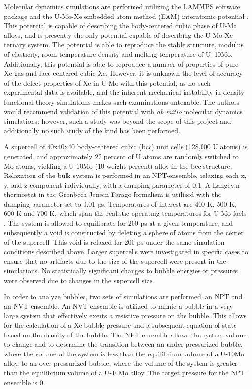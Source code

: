 \documentclass[review]{elsarticle}
\providecommand{\DIFaddtex}[1]{{\protect\color{blue} \sf #1}} %
\providecommand{\DIFaddbegin}{} %
\providecommand{\DIFaddend}{} %
\providecommand{\DIFadd}[1]{\texorpdfstring{\DIFaddtex{#1}}{#1}} %
\newcommand{\DIFaddincludegraphics}[2][]{{\color{blue}\fbox{\DIFOincludegraphics[#1]{#2}}}} %
\DeclareRobustCommand{\DIFaddbegin}{\DIFOaddbegin \let\includegraphics\DIFaddincludegraphics} %
\DeclareRobustCommand{\DIFaddend}{\DIFOaddend \let\includegraphics\DIFOincludegraphics} %
\begin{document}
Molecular dynamics simulations are performed utilizing the LAMMPS \cite{plimpton1995} software package and the U-Mo-Xe embedded atom method (EAM) interatomic potential \cite{smirnovaUMo}. \DIFaddbegin \DIFadd{This potential is capable of describing the body-centered cubic phase of U-Mo alloys, and is presently the only potential capable of describing the U-Mo-Xe ternary system. The potential is able to reproduce the stable structure, modulus of elasticity, room-temperature density and melting temperature of U–10Mo. Additionally, this potential is able to reproduce a number of properties of pure Xe gas and face-centered cubic Xe. However, it is unknown the level of accuracy of the defect properties of Xe in U-Mo with this potential, as no such experimental data is available, and the inherent mechanical instability in density functional theory simulations makes such examinations untenable. The authors would recommend validation of this potential with \textit{ab initio} molecular dynamics simulations; however, such a study was beyond the scope of this project and additionally no such study of the kind has been performed. 
}

\DIFaddend A supercell of 40x40x40 body-centered cubic (bcc) unit cells (128,000 U atoms) is generated, and approximately 22 percent of U atoms are randomly switched to Mo atoms, yielding a U-10Mo (10 weight percent) alloy in the bcc structure. Relaxation of the bulk system is performed in an NPT-ensemble, relaxing each x, y, and z component individually, with a damping parameter of 0.1. A Langevin thermostat in the Gronbech-Jensen-Farago \cite{gjf2013, gjf2014} formalism is utilized with the damping parameter set to 0.01 ps. Temperatures of interest are 400 K, 500 K, 600 K and 700 K, which span the realistic operating temperatures for U-Mo fuels \DIFaddbegin \DIFadd{\cite{umo_prelim_report2017}}\DIFaddend . The system is allowed to equilibrate for 200 ps at a given temperature, and subsequently a void is constructed by deleting a sphere of atoms from the center of the supercell. This void is relaxed for 200 ps under the same simulation conditions described above. \DIFaddbegin \DIFadd{Larger supercells were investigated in specific cases to ensure that no artifacts due to the size of the supercell were present in the simulations. No statistically significant changes to bubble energies or pressures were observed due to changes in the supercell size. 
}\DIFaddend 

In order to analyze bubbles, two sets of simulations are performed: an NPT and an NVT ensemble. An NVT ensemble is utilized to mimic a bubble in a very large system that effectively exerts a resistive pressure on the bubble. This allows for the calculation of a Xe bubble pressure and a subsequent equation of state based on the density of the bubble. The NPT ensemble allows the system volume to change and to determine the transition between an under-pressurized bubble, where the volume of the system is less than the equilibrium volume of a U-10Mo alloy, to an over-pressurized bubble, where the volume of the system is greater than the equilibrium volume of a U-10Mo alloy. The target pressure for the NPT ensemble is 0. 
\end{document}
